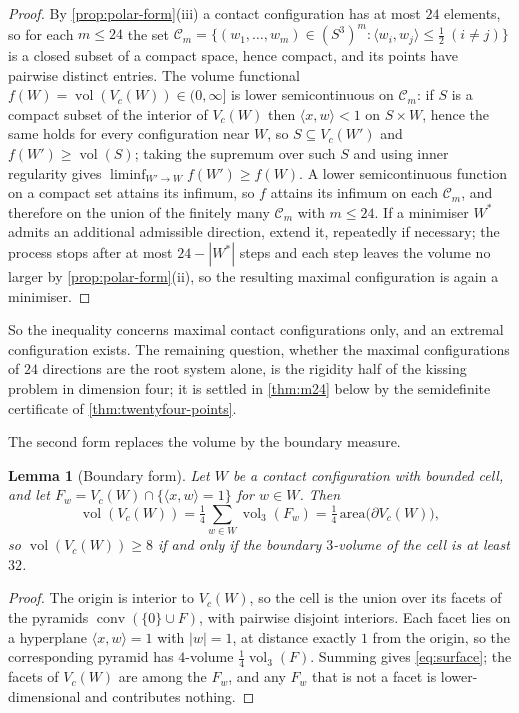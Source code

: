 \documentclass[11pt,reqno]{amsart}
\renewcommand{\_}{\origunderscore\allowbreak}
\numberwithin{equation}{section}
\theoremstyle{plain}
\newtheorem{lem}[thm]{Lemma}
\theoremstyle{definition}
\theoremstyle{remark}
\DeclareMathOperator{\vol}{vol}
\DeclareMathOperator{\conv}{conv}
\begin{document}
\begin{proof}
By \cref{prop:polar-form}(iii) a contact configuration has at most $24$
elements, so for each $m\le24$ the set
$\mathcal{C}_m=\{(w_1,\dots,w_m)\in(S^3)^m:\langle
w_i,w_j\rangle\le\tfrac12\ (i\ne j)\}$ is a closed subset of a compact
space, hence compact, and its points have pairwise distinct entries.
The volume functional $f(W)=\vol(V_c(W))\in(0,\infty]$ is lower
semicontinuous on $\mathcal{C}_m$: if $S$ is a compact subset of the
interior of $V_c(W)$ then $\langle x,w\rangle<1$ on $S\times W$, hence
the same holds for every configuration near $W$, so $S\subseteq
V_c(W')$ and $f(W')\ge\vol(S)$; taking the supremum over such $S$ and
using inner regularity gives $\liminf_{W'\to W}f(W')\ge f(W)$. A lower
semicontinuous function on a compact set attains its infimum, so $f$
attains its infimum on each $\mathcal{C}_m$, and therefore on the union
of the finitely many $\mathcal{C}_m$ with $m\le24$. If a minimiser
$W^{*}$ admits an additional admissible direction, extend it, repeatedly
if necessary; the process stops after at most $24-|W^{*}|$ steps and
each step leaves the volume no larger by \cref{prop:polar-form}(ii), so
the resulting maximal configuration is again a minimiser.
\end{proof}

So the inequality concerns maximal contact configurations only, and an
extremal configuration exists. The remaining question, whether the
maximal configurations of $24$ directions are the root system alone, is
the rigidity half of the kissing problem in dimension four; it is settled
in \cref{thm:m24} below by the semidefinite certificate of
\cref{thm:twentyfour-points}.

The second form replaces the volume by the boundary measure.

\begin{lem}[Boundary form]\label{lem:surface-form}
Let $W$ be a contact configuration with bounded cell, and let
$F_w=V_c(W)\cap\{\langle x,w\rangle=1\}$ for $w\in W$. Then
\begin{equation}\label{eq:surface}
  \vol(V_c(W))=\tfrac14\sum_{w\in W}\vol_3(F_w)
  =\tfrac14\,\mathrm{area}\bigl(\partial V_c(W)\bigr),
\end{equation}
so $\vol(V_c(W))\ge8$ if and only if the boundary $3$-volume of the cell
is at least $32$.
\end{lem}

\begin{proof}
The origin is interior to $V_c(W)$, so the cell is the union over its
facets of the pyramids $\conv(\{0\}\cup F)$, with pairwise disjoint
interiors. Each facet lies on a hyperplane $\langle x,w\rangle=1$ with
$|w|=1$, at distance exactly $1$ from the origin, so the corresponding
pyramid has $4$-volume $\tfrac14\vol_3(F)$. Summing gives
\eqref{eq:surface}; the facets of $V_c(W)$ are among the $F_w$, and any
$F_w$ that is not a facet is lower-dimensional and contributes nothing.
\end{proof}
\end{document}
